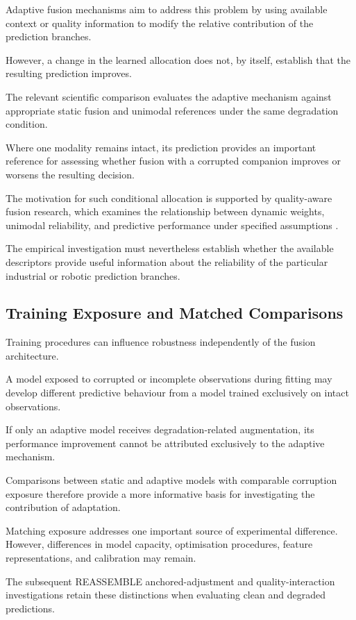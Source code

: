 Adaptive fusion mechanisms aim to address this problem by using available context or quality information to modify the relative contribution of the prediction branches.

However, a change in the learned allocation does not, by itself, establish that the resulting prediction improves.

The relevant scientific comparison evaluates the adaptive mechanism against appropriate static fusion and unimodal references under the same degradation condition.

Where one modality remains intact, its prediction provides an important reference for assessing whether fusion with a corrupted companion improves or worsens the resulting decision.

The motivation for such conditional allocation is supported by quality-aware fusion research, which examines the relationship between dynamic weights, unimodal reliability, and predictive performance under specified assumptions \parencite{Zhang2023QMF}.

The empirical investigation must nevertheless establish whether the available descriptors provide useful information about the reliability of the particular industrial or robotic prediction branches.

\subsection{Training Exposure and Matched Comparisons}

Training procedures can influence robustness independently of the fusion architecture.

A model exposed to corrupted or incomplete observations during fitting may develop different predictive behaviour from a model trained exclusively on intact observations.

If only an adaptive model receives degradation-related augmentation, its performance improvement cannot be attributed exclusively to the adaptive mechanism.

Comparisons between static and adaptive models with comparable corruption exposure therefore provide a more informative basis for investigating the contribution of adaptation.

Matching exposure addresses one important source of experimental difference. However, differences in model capacity, optimisation procedures, feature representations, and calibration may remain.

The subsequent REASSEMBLE anchored-adjustment and quality-interaction investigations retain these distinctions when evaluating clean and degraded predictions.

